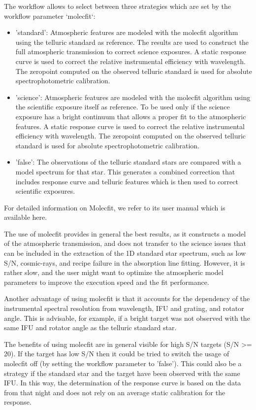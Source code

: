 The workflow allows to select between three strategies which are set by the workflow parameter `molecfit`:
\begin{itemize}
\item 'standard': Atmospheric features are modeled with the molecfit algorithm using the telluric standard as
reference. The results are used to construct the full atmospheric transmission to correct
science exposures. A static response curve is used to correct the relative instrumental
efficiency with wavelength. The zeropoint computed on the observed telluric standard is used for
absolute spectrophotometric calibration.

\item 'science': Atmospheric features are modeled with the molecfit algorithm using the scientific exposure itself
as reference. To be used only if the science exposure has a bright continuum that allows
a proper fit to the atmospheric features. A static response curve is used to correct the
relative instrumental efficiency with wavelength. The zeropoint computed
on the observed telluric standard is used for absolute spectrophotometric calibration.

\item 'false': The observations of the telluric standard stars are compared with a model spectrum for that star.
This generates a combined correction that includes response curve and telluric features which is then
used to correct scientific exposures.
\end{itemize}

For detailed information on Molecfit, we refer to its user manual which is available
here.

The use of molecfit provides in general the best results, as it constructs a model of the atmospheric
transmission, and does not transfer to the science issues that can be included in the extraction of the 1D
standard star spectrum, such as low S/N, cosmic-rays, and recipe failure in the absorption line fitting. However,
it is rather slow, and the user might want to optimize the atmospheric model parameters to improve the execution
speed and the fit performance.

Another advantage of using molecfit is that it accounts for the dependency of the instrumental spectral
resolution from wavelength, IFU and grating, and rotator angle. This is advisable, for example, if a bright target
was not observed with the same IFU and rotator angle as the telluric standard star.

The benefits of using molecfit are in general visible for high S/N targets (S/N >= 20). If the target has
low S/N then it could be tried to switch the usage of molecfit off (by setting the workflow parameter to 'false').
This could also be a strategy if the standard star and the target have been observed with the same IFU.
In this way, the determination of the response curve is based on the data from that night and does not rely on
an average static calibration for the response.

